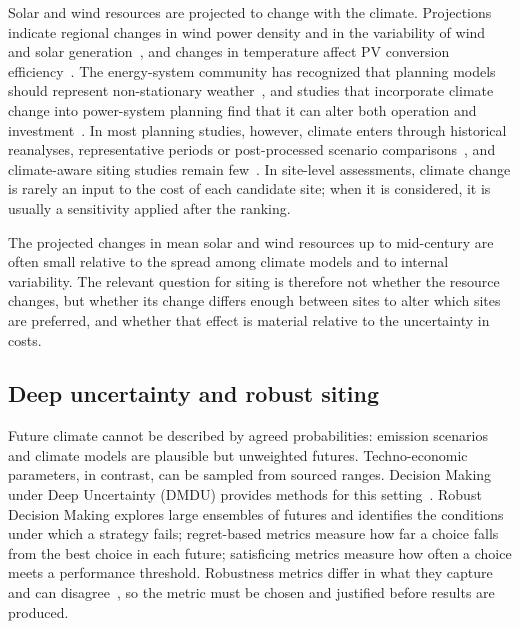 Solar and wind resources are projected to change with the climate. Projections indicate regional changes in wind power density and in the variability of wind and solar generation~\cite{tobin2016climate, reyers2016future, pryor2020climate, jerez2019future}, and changes in temperature affect PV conversion efficiency~\cite{skoplaki2009}. The energy-system community has recognized that planning models should represent non-stationary weather~\cite{craig2018review, cronin2018climate}, and studies that incorporate climate change into power-system planning find that it can alter both operation and investment~\cite{ralstonfonseca2021climate, bloomfield2021quantifying}. In most planning studies, however, climate enters through historical reanalyses, representative periods or post-processed scenario comparisons~\cite{pfenninger2017dealing, harang2020incorporating, bennett2021extending}, and climate-aware siting studies remain few~\cite{ashraf2024_climate_smart_siting}. In site-level assessments, climate change is rarely an input to the cost of each candidate site; when it is considered, it is usually a sensitivity applied after the ranking.

The projected changes in mean solar and wind resources up to mid-century are often small relative to the spread among climate models and to internal variability. The relevant question for siting is therefore not whether the resource changes, but whether its change differs enough between sites to alter which sites are preferred, and whether that effect is material relative to the uncertainty in costs.

\subsection{Deep uncertainty and robust siting}

Future climate cannot be described by agreed probabilities: emission scenarios and climate models are plausible but unweighted futures. Techno-economic parameters, in contrast, can be sampled from sourced ranges. Decision Making under Deep Uncertainty (DMDU) provides methods for this setting~\cite{Lempert2003, marchau2019}. Robust Decision Making explores large ensembles of futures and identifies the conditions under which a strategy fails; regret-based metrics measure how far a choice falls from the best choice in each future; satisficing metrics measure how often a choice meets a performance threshold. Robustness metrics differ in what they capture and can disagree~\cite{kwakkel2016, mcphail2018}, so the metric must be chosen and justified before results are produced.

